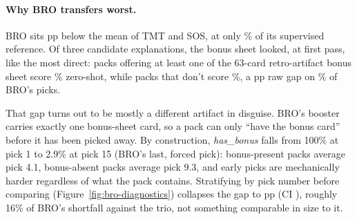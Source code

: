 \paragraph{Why BRO transfers worst.}
BRO sits \BroTrioShortfall pp below the mean of TMT and SOS, at only
\RatioBro\% of its supervised reference. Of three candidate explanations, the bonus
sheet looked, at first pass, like the most direct: packs offering at
least one of the 63-card retro-artifact bonus sheet score
\BonusPresentTopOne\% zero-shot, while packs that don't score
\BonusAbsentTopOne\%, a \BonusRawGap pp raw gap on \BonusPresentFrac\% of
BRO's picks.

That gap turns out to be mostly a different artifact in disguise. BRO's
booster carries exactly one bonus-sheet card, so a pack can only ``have
the bonus card'' before it has been picked away. By construction,
\emph{has\_bonus} falls from 100\% at pick 1 to 2.9\% at pick 15 (BRO's
last, forced pick): bonus-present packs average pick 4.1, bonus-absent
packs average pick 9.3, and early picks are mechanically harder regardless
of what the pack contains. Stratifying by pick number before comparing
(Figure~\ref{fig:bro-diagnostics}) collapses the gap to \BonusStratGap pp
(CI \BonusStratGapCi), roughly 16\% of BRO's shortfall against the trio,
not something comparable in size to it.

